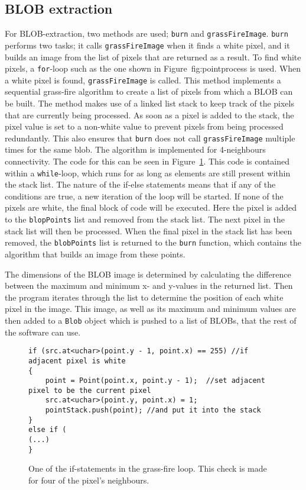\subsection{BLOB extraction}
For BLOB-extraction, two methods are used; \texttt{burn} and \texttt{grassFireImage}. \texttt{burn} performs two tasks; it calls \texttt{grassFireImage} when it finds a white pixel, and it builds an image from the list of pixels that are returned as a result. To find white pixels, a \texttt{for}-loop such as the one shown in Figure~{fig:pointprocess} is used. When a white pixel is found, \texttt{grassFireImage} is called. This method implements a sequential grass-fire algorithm to create a list of pixels from which a BLOB can be built. The method makes use of a linked list stack to keep track of the pixels that are currently being processed. As soon as a pixel is added to the stack, the pixel value is set to a non-white value to prevent pixels from being processed redundantly. This also ensures that \texttt{burn} does not call \texttt{grassFireImage} multiple times for the same blob. The algorithm is implemented for 4-neighbours connectivity. The code for this can be seen in Figure~\ref{fig:grassFireIf}. This code is contained within a \texttt{while}-loop, which runs for as long as elements are still present within the stack list. The nature of the if-else statements means that if any of the conditions are true, a new iteration of the loop will be started. If none of the pixels are white, the final block of code will be executed. Here the pixel is added to the \texttt{blopPoints} list and removed from the stack list. The next pixel in the stack list will then be processed. When the final pixel in the stack list has been removed, the \texttt{blobPoints} list is returned to the \texttt{burn} function, which contains the algorithm that builds an image from these points.

The dimensions of the BLOB image is determined by calculating the difference between the maximum and minimum x- and y-values in the returned list. Then the program iterates through the list to determine the position of each white pixel in the image. This image, as well as its maximum and minimum values are then added to a \texttt{Blob} object which is pushed to a list of BLOBs, that the rest of the software can use.  

\begin{figure}
\begin{lstlisting}
if (src.at<uchar>(point.y - 1, point.x) == 255) //if adjacent pixel is white 
{
	point = Point(point.x, point.y - 1);  //set adjacent pixel to be the current pixel
	src.at<uchar>(point.y, point.x) = 1;
	pointStack.push(point); //and put it into the stack
}
else if (
(...)
}
\end{lstlisting}
\caption{One of the if-statements in the grass-fire loop. This check is made for four of the pixel's neighbours. \label{fig:grassFireIf}}
\end{figure}

